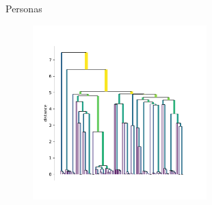 \begin{frame}{Personas}

\begin{figure}[!htb]
\centering
\includegraphics[width=0.6\textwidth]{Images/persona_linkage_tree.pdf}
\label{fig:persona_grouping_linkage_tree}
\end{figure}
    
\end{frame}
